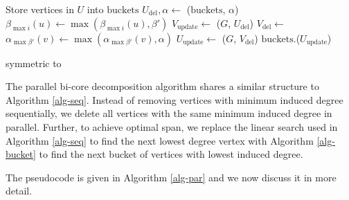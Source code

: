 \begin{algorithm}[t!]
\begin{algorithmic}[1]
 \State {} 
 \State Store vertices in $U$ into $\text{buckets}$ 
     \State $U_\text{del},\alpha \leftarrow$ ($\text{buckets}$, $\alpha$) 
        \State $\beta_{\max i}(u) \leftarrow \max(\beta_{\max i}(u),\beta')$ 
     \EndParFor
     \EndParFor
     \State $V_\text{update}\leftarrow$ ($G$, $U_\text{del}$) \label{peelu}
     \State $V_\text{del}\leftarrow$ 
     \State $\alpha_{\max \beta'}(v)\leftarrow \max(\alpha_{\max \beta'}(v), \alpha)$ \label{updatealpha}
     \EndParFor
     \State $U_\text{update} \leftarrow$ ($G$, $V_\text{del}$) \label{removev}
    \State $\text{buckets}$.($U_\text{update}$) 
 \EndWhile
 \EndProcedure

 \State symmetric to 
 \EndProcedure
 \end{algorithmic}
 \label{alg-par}
\end{algorithm}

The parallel bi-core decomposition algorithm shares a similar structure to Algorithm \ref{alg-seq}. Instead of removing vertices with minimum induced degree sequentially, we delete all vertices with the same minimum induced degree in parallel. Further, to achieve optimal span, we replace the linear search used in Algorithm \ref{alg-seq} to find the next lowest degree vertex with Algorithm \ref{alg-bucket} to find the next bucket of vertices with lowest induced degree.   

The pseudocode is given in Algorithm \ref{alg-par} and we now discuss it in more detail. 

